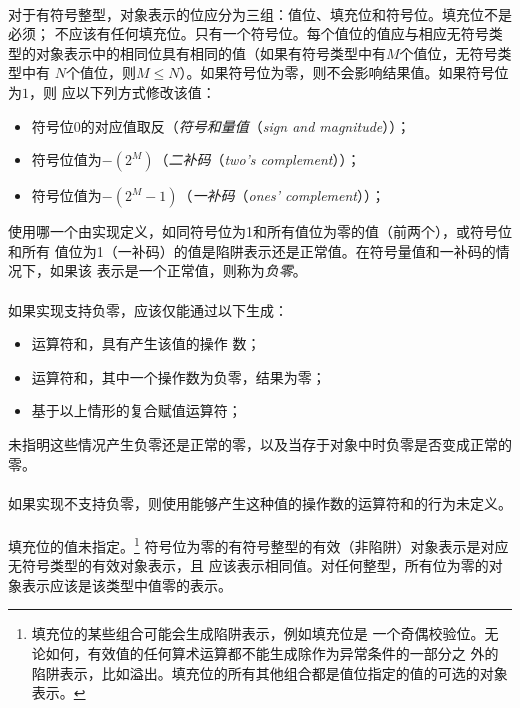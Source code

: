 {\paragraph{}
对于有符号整型，对象表示的位应分为三组：值位、填充位和符号位。填充位不是必须；
不应该有任何填充位。只有一个符号位。每个值位的值应与相应无符号类
型的对象表示中的相同位具有相同的值（如果有符号类型中有$M$个值位，无符号类型中有
$N$个值位，则$M \le N$）。如果符号位为零，则不会影响结果值。如果符号位为$1$，则
应以下列方式修改该值：
\begin{itemize}
  \item{符号位$0$的对应值取反（\textit{符号和量值}（\textit{sign and
    magnitude}））；}
  \item{符号位值为$-(2^M)$（\textit{二补码}（\textit{two's complement}））；}
  \item{符号位值为$-(2^M-1)$（\textit{一补码}（\textit{ones' complement}））；}
\end{itemize}
使用哪一个由实现定义，如同符号位为1和所有值位为零的值（前两个），或符号位和所有
值位为1（一补码）的值是陷阱表示还是正常值。在符号量值和一补码的情况下，如果该
表示是一个正常值，则称为\textit{负零}。

\paragraph{}
如果实现支持负零，应该仅能通过以下生成：
\begin{itemize}
  \item{运算符和\tm{\tg{}\tg{}}，具有产生该值的操作
    数；}
  \item{运算符和\tm{\%}，其中一个操作数为负零，结果为零；}
  \item{基于以上情形的复合赋值运算符；}
\end{itemize}
未指明这些情况产生负零还是正常的零，以及当存于对象中时负零是否变成正常的零。

\paragraph{}
如果实现不支持负零，则使用能够产生这种值的操作数的运算符和\tm{\tg{}\tg{}}的行为未定义。

\paragraph{}
填充位的值未指定。\footnote{填充位的某些组合可能会生成陷阱表示，例如填充位是
一个奇偶校验位。无论如何，有效值的任何算术运算都不能生成除作为异常条件的一部分之
外的陷阱表示，比如溢出。填充位的所有其他组合都是值位指定的值的可选的对象表示。}
符号位为零的有符号整型的有效（非陷阱）对象表示是对应无符号类型的有效对象表示，且
应该表示相同值。对任何整型，所有位为零的对象表示应该是该类型中值零的表示。

}
